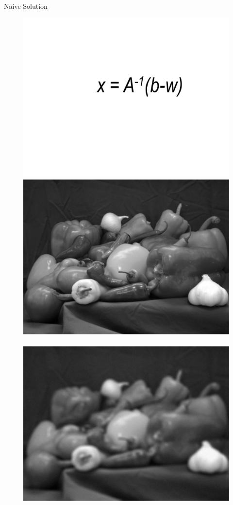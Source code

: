 \documentclass[12pt]{beamer}
\begin{document}
\begin{frame}{Naive Solution}
\begin{figure}
\centering
\includegraphics[scale=0.4]{../figures/naive2} \\[2ex]
\includegraphics[scale=0.2]{../figures/fig1} \,
\includegraphics[scale=0.2]{../figures/fig4} \,

\end{figure}
\end{frame}
\end{document}
